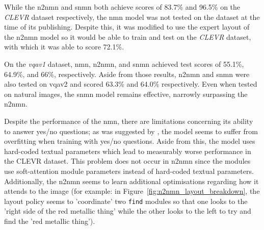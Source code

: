 While the \gls{n2nmn} and \gls{snmn} both achieve scores of 83.7\% and 96.5\% on the \textit{CLEVR} dataset respectively, the \gls{nmn} model was not tested on the dataset at the time of its publishing.
Despite this, it was modified to use the expert layout of the \gls{n2nmn} model so it would be able to train and test on the \textit{CLEVR} dataset, with which it was able to score 72.1\%\cite{hu_learning_2017}.

On the \textit{\gls{vqa}v1} dataset, \gls{nmn}, \gls{n2nmn}, and \gls{snmn} achieved test scores of 55.1\%, 64.9\%, and 66\%, respectively. Aside from those results, \gls{n2nmn} and \gls{snmn} were also tested on \gls{vqa}v2 and scored 63.3\% and 64.0\% respectively. Even when tested on natural images, the \gls{snmn} model remains effective, narrowly surpassing the \gls{n2nmn}.

Despite the performance of the \gls{nmn}, there are limitations concerning its ability to answer yes/no questions; as was suggested by \citeauthor{andreas_deep_2016}\cite{andreas_deep_2016}, the model seems to suffer from overfitting when training with yes/no questions.
Aside from this, the model uses hard-coded textual parameters which lead to measurably worse performance in the CLEVR dataset.
This problem does not occur in \gls{n2nmn} since the modules use soft-attention module parameters instead of hard-coded textual parameters.
Additionally, the \gls{n2nmn} seems to learn additional optimisations regarding how it attends to the image (for example: in Figure~\ref{fig:n2nmn_layout_breakdown}, the layout policy seems to 'coordinate' two \texttt{find} modules so that one looks to the 'right side of the red metallic thing' while the other looks to the left to try and find the 'red metallic thing').

